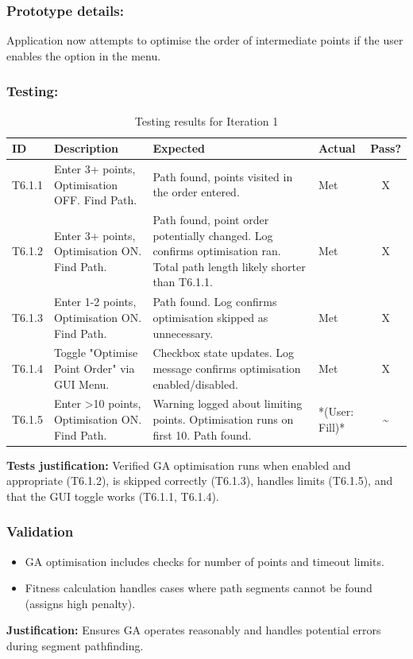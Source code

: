 \subsubsection{Prototype details:}
Application now attempts to optimise the order of intermediate points if the user enables the option in the menu.

\subsubsection{Testing:} %
\begin{table}[htbp]
	\centering
	\begin{tabularx}{\textwidth}{|l|X|p{4.5cm}|p{1.5cm}|c|}
		\hline
		\textbf{ID} & \textbf{Description} & \textbf{Expected} & \textbf{Actual} & \textbf{Pass?} \\
		\hline
		T6.1.1 & Enter 3+ points, Optimisation OFF. Find Path. & Path found, points visited in the order entered. & Met & X \\
		\hline
		T6.1.2 & Enter 3+ points, Optimisation ON. Find Path. & Path found, point order potentially changed. Log confirms optimisation ran. Total path length likely shorter than T6.1.1. & Met & X \\
		\hline
		T6.1.3 & Enter 1-2 points, Optimisation ON. Find Path. & Path found. Log confirms optimisation skipped as unnecessary. & Met & X \\
		\hline
		T6.1.4 & Toggle "Optimise Point Order" via GUI Menu. & Checkbox state updates. Log message confirms optimisation enabled/disabled. & Met & X \\
		\hline
		T6.1.5 & Enter >10 points, Optimisation ON. Find Path. & Warning logged about limiting points. Optimisation runs on first 10. Path found. & *(User: Fill)* & \~{} \\
		\hline
	\end{tabularx}
	\caption{Testing results for Iteration 1}
\end{table}
\textbf{Tests justification:} Verified GA optimisation runs when enabled and appropriate (T6.1.2), is skipped correctly (T6.1.3), handles limits (T6.1.5), and that the GUI toggle works (T6.1.1, T6.1.4).

\subsubsection{Validation}
\begin{itemize}
	\item GA optimisation includes checks for number of points and timeout limits.
	\item Fitness calculation handles cases where path segments cannot be found (assigns high penalty).
\end{itemize}
\textbf{Justification:} Ensures GA operates reasonably and handles potential errors during segment pathfinding.

